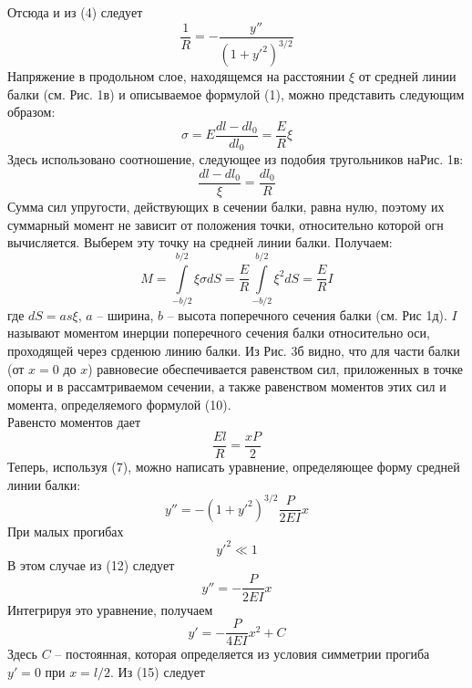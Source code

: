 \documentclass[a4paper,12pt]{article} %
\begin{document}
Отсюда и из (4) следует
\begin{equation}
\frac{1}{R} = -\frac{y''}{(1+y'^2)^{3/2}}
\end{equation}
Напряжение в продольном слое, находящемся на расстоянии $\xi$ от средней линии балки (см. Рис. 1в) и описываемое формулой (1), можно представить следующим образом:
\begin{equation}
\sigma = E\frac{dl - dl_0}{dl_0} = \frac{E}{R}\xi
\end{equation}
Здесь использовано соотношение, следующее из подобия тругольников наРис. 1в:
\begin{equation}
\frac{dl-dl_0}{\xi} = \frac{dl_0}{R}
\end{equation}
Сумма сил упругости, действующих в сечении балки, равна нулю, поэтому их суммарный момент не зависит от положения точки, относительно которой огн вычисляется. Выберем эту точку на средней линии балки. Получаем:
\begin{equation}
M = \int\limits_{-b/2}^{b/2} \xi\sigma d S = \frac{E}{R}\int\limits_{-b/2}^{b/2}\xi^2 d S = \frac{E}{R}I
\end{equation}
где $dS = as\xi$, $a$ -- ширина, $b$ -- высота поперечного сечения балки (см. Рис 1д). $I$ называют моментом инерции поперечного сечения балки относительно оси, проходящей через срденюю линию балки. Из Рис. 3б видно, что для части балки (от $x = 0$ до $x$) равновесие обеспечивается равенством сил, приложенных в точке опоры и в рассамтриваемом сечении, а также равенством моментов этих сил и момента, определяемого формулой (10).\\
Равенсто моментов дает
\begin{equation}
\frac{El}{R} = \frac{xP}{2}
\end{equation}
Теперь, используя (7), можно написать уравнение, определяющее форму средней линии балки:
\begin{equation}
y'' = -(1+y'^2)^{3/2}\frac{P}{2EI}x
\end{equation}
При малых прогибах
\begin{equation}
y'^2 \ll 1
\end{equation}
В этом случае из (12) следует
\begin{equation}
y'' = -\frac{P}{2EI}x
\end{equation}
Интегрируя это уравнение, получаем
\begin{equation}
y' = -\frac{P}{4EI}x^2 + C
\end{equation}
Здесь $C$ -- постоянная, которая определяется из условия симметрии прогиба $y' = 0$ при $x = l/2$. Из (15) следует
\end{document}
